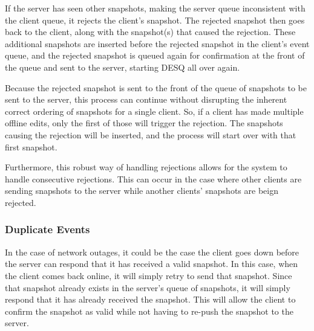 If the server has seen other snapshots, making the server queue inconsistent with the client queue, it rejects the client's snapshot. The rejected snapshot then goes back to the client, along with the snapshot(s) that caused the rejection. These additional snapshots are inserted before the rejected snapshot in the client's event queue, and the rejected snapshot is queued again for confirmation at the front of the queue and sent to the server, starting DESQ all over again. 

Because the rejected snapshot is sent to the front of the queue of snapshots to be sent to the server, this process can continue without disrupting the inherent correct ordering of snapshots for a single client. So, if a client has made multiple offline edits, only the first of those will trigger the rejection. The snapshots causing the rejection will be inserted, and the process will start over with that first snapshot.

Furthermore, this robust way of handling rejections allows for the system to handle consecutive rejections. This can occur in the case where other clients are sending snapshots to the server while another clients' snapshots are beign rejected.

\subsubsection{Duplicate Events}

In the case of network outages, it could be the case the client goes down before the server can respond that it has received a valid snapshot. In this case, when the client comes back online, it will simply retry to send that snapshot. Since that snapshot already exists in the server’s queue of snapshots, it will simply respond that it has already received the snapshot. This will allow the client to confirm the snapshot as valid while not having to re-push the snapshot to the server.